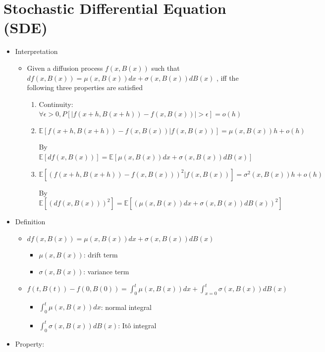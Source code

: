 \documentclass[a4paper]{article}
\begin{document}
\section{Stochastic Differential Equation (SDE)}
\begin{itemize}
    \item Interpretation
        \begin{itemize}
            \item Given a diffusion process $f(x, B(x))$ such that $d f(x, B(x)) = \mu(x, B(x)) dx + \sigma(x, B(x)) d B(x)$ , iff the following three properties are satisfied
                \begin{enumerate}
                    \item Continuity: $\forall \epsilon > 0, P[|f(x+h, B(x+h)) - f(x, B(x))| > \epsilon] = o(h)$
                    \item $\mathbb{E}[f(x+h, B(x+h)) - f(x, B(x))| f(x, B(x))] = \mu(x, B(x)) h + o(h)$

                        By $\mathbb{E}[d f(x, B(x))] = \mathbb{E}[\mu(x, B(x)) dx + \sigma(x, B(x)) d B(x)]$
                    \item $\mathbb{E}[(f(x+h, B(x+h)) - f(x, B(x)))^2| f(x, B(x))] = \sigma^2(x, B(x)) h + o(h)$

                        By $\mathbb{E}[(d f(x, B(x)))^2] = \mathbb{E}[(\mu(x, B(x)) dx + \sigma(x, B(x)) d B(x))^2]$
                \end{enumerate}
        \end{itemize}
    \item Definition
        \begin{itemize}
            \item $d f(x, B(x)) = \mu(x, B(x)) dx + \sigma(x, B(x)) d B(x)$
                \begin{itemize}
                    \item $\mu(x, B(x))$: drift term
                    \item $\sigma(x, B(x))$: variance term
                \end{itemize}
            \item $f(t, B(t)) - f(0, B(0)) = \int_0^t \mu(x, B(x)) dx + \int_{x=0}^t \sigma(x, B(x)) d B(x)$
                \begin{itemize}
                    \item $\int_0^t \mu(x, B(x)) dx$: normal integral
                    \item $\int_0^t \sigma(x, B(x)) d B(x)$: It\^{o} integral
                \end{itemize}
        \end{itemize}
    \item Property:


\end{itemize}
\end{document}
